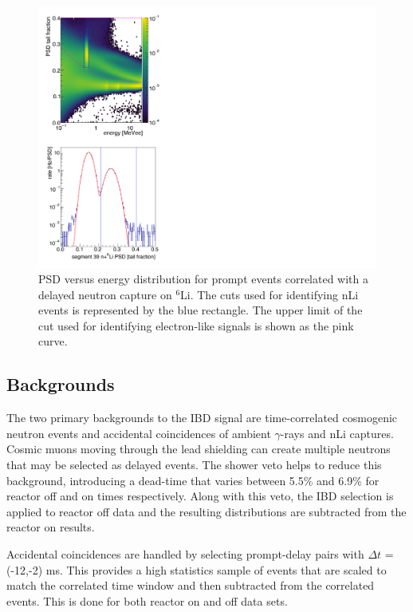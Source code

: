 \begin{figure}[h]
	\centering
	\includegraphics[width=0.6\linewidth]{tex/7-oscillation-images/PSDvsE_Corr_nLi}
	\caption{PSD versus energy distribution for prompt events correlated with a delayed neutron capture on $^6$Li. The cuts used for identifying nLi events is represented by the blue rectangle. The upper limit of the cut used for identifying electron-like signals is shown as the pink curve.}
	\label{fig:psdvsecorrnli}
\end{figure}



\subsection{Backgrounds}

The two primary backgrounds to the IBD signal are time-correlated cosmogenic neutron events and accidental coincidences of ambient $\gamma$-rays and nLi captures.
Cosmic muons moving through the lead shielding can create multiple neutrons that may be selected as delayed events.
The shower veto helps to reduce this background, introducing a dead-time that varies between 5.5\% and 6.9\% for reactor off and on times respectively.
Along with this veto, the IBD selection is applied to reactor off data and the resulting distributions are subtracted from the reactor on results.

Accidental coincidences are handled by selecting prompt-delay pairs with $\Delta t$ = (-12,-2) ms.
This provides a high statistics sample of events that are scaled to match the correlated time window and then subtracted from the correlated events. 
This is done for both reactor on and off data sets.

